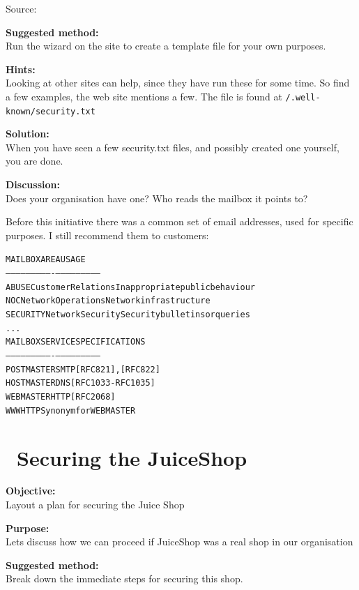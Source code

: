 \documentclass[a4paper,11pt,notitlepage]{report}
\begin{document}
Source: 

{\bf Suggested method:}\\
Run the wizard on the site to create a template file for your own purposes.

{\bf Hints:}\\
Looking at other sites can help, since they have run these for some time. So find a few examples, the web site mentions a few. The file is found at \verb+/.well-known/security.txt+

{\bf Solution:}\\
When you have seen a few security.txt files, and possibly created one yourself, you are done.

{\bf Discussion:}\\
Does your organisation have one? Who reads the mailbox it points to?

Before this initiative there was a common set of email addresses, used for specific purposes. I still recommend them to customers:

\begin{alltt}\footnotesize
MAILBOX       AREA                USAGE
-----------   ----------------    ---------------------------
ABUSE         Customer Relations  Inappropriate public behaviour
NOC           Network Operations  Network infrastructure
SECURITY      Network Security    Security bulletins or queries
...
MAILBOX       SERVICE             SPECIFICATIONS
-----------   ----------------    ---------------------------
POSTMASTER    SMTP                [RFC821], [RFC822]
HOSTMASTER    DNS                 [RFC1033-RFC1035]
WEBMASTER     HTTP                [RFC 2068]
WWW           HTTP                Synonym for WEBMASTER
\end{alltt}


\chapter{\faInfoCircle\ Securing the JuiceShop}
\label{ex:secure-juiceshop}

{\bf Objective:}\\
Layout a plan for securing the Juice Shop

{\bf Purpose:}\\
Lets discuss how we can proceed if JuiceShop was a real shop in our organisation

{\bf Suggested method:}\\
Break down the immediate steps for securing this shop.
\end{document}
